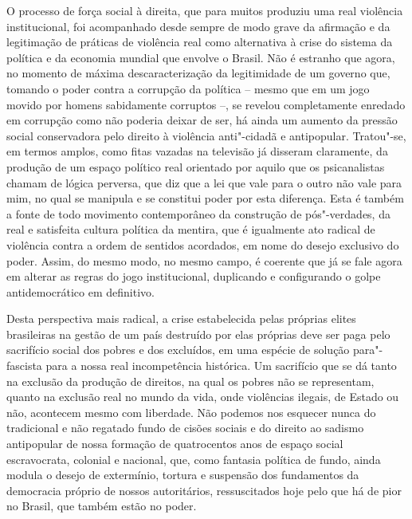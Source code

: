 O processo de força social à direita, que para muitos produziu uma real
violência institucional, foi acompanhado desde sempre de modo grave da
afirmação e da legitimação de práticas de violência real como
alternativa à crise do sistema da política e da economia mundial que
envolve o Brasil. Não é estranho que agora, no momento de máxima
descaracterização da legitimidade de um governo que, tomando o poder
contra a corrupção da política -- mesmo que em um jogo movido por homens
sabidamente corruptos --, se revelou completamente enredado em corrupção
como não poderia deixar de ser, há ainda um aumento da pressão social
conservadora pelo direito à violência anti"-cidadã e antipopular.
Tratou"-se, em termos amplos, como fitas vazadas na televisão já disseram
claramente, da produção de um espaço político real orientado por aquilo
que os psicanalistas chamam de lógica perversa, que diz que a lei que
vale para o outro não vale para mim, no qual se manipula e se constitui
poder por esta diferença. Esta é também a fonte de todo movimento
contemporâneo da construção de pós"-verdades, da real e satisfeita
cultura política da mentira, que é igualmente ato radical de violência
contra a ordem de sentidos acordados, em nome do desejo exclusivo do
poder. Assim, do mesmo modo, no mesmo campo, é coerente que já se fale
agora em alterar as regras do jogo institucional, duplicando e
configurando o golpe antidemocrático em definitivo.

Desta perspectiva mais radical, a crise estabelecida pelas próprias
elites brasileiras na gestão de um país destruído por elas próprias deve
ser paga pelo sacrifício social dos pobres e dos excluídos, em uma
espécie de solução para"-fascista para a nossa real incompetência
histórica. Um sacrifício que se dá tanto na exclusão da produção de
direitos, na qual os pobres não se representam, quanto na exclusão real
no mundo da vida, onde violências ilegais, de Estado ou não, acontecem
mesmo com liberdade. Não podemos nos esquecer nunca do tradicional e não
regatado fundo de cisões sociais e do direito ao sadismo antipopular de
nossa formação de quatrocentos anos de espaço social escravocrata,
colonial e nacional, que, como fantasia política de fundo, ainda modula
o desejo de extermínio, tortura e suspensão dos fundamentos da
democracia próprio de nossos autoritários, ressuscitados hoje pelo que
há de pior no Brasil, que também estão no poder.

